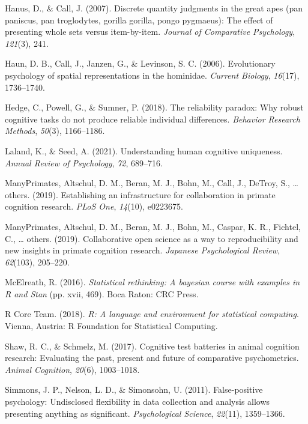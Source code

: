\documentclass[10pt, letterpaper]{article}
\begin{document}
\leavevmode\hypertarget{ref-hanus2007discrete}{}%
Hanus, D., \& Call, J. (2007). Discrete quantity judgments in the great
apes (pan paniscus, pan troglodytes, gorilla gorilla, pongo pygmaeus):
The effect of presenting whole sets versus item-by-item. \emph{Journal
of Comparative Psychology}, \emph{121}(3), 241.

\leavevmode\hypertarget{ref-haun2006evolutionary}{}%
Haun, D. B., Call, J., Janzen, G., \& Levinson, S. C. (2006).
Evolutionary psychology of spatial representations in the hominidae.
\emph{Current Biology}, \emph{16}(17), 1736--1740.

\leavevmode\hypertarget{ref-hedge2018reliability}{}%
Hedge, C., Powell, G., \& Sumner, P. (2018). The reliability paradox:
Why robust cognitive tasks do not produce reliable individual
differences. \emph{Behavior Research Methods}, \emph{50}(3), 1166--1186.

\leavevmode\hypertarget{ref-laland2021understanding}{}%
Laland, K., \& Seed, A. (2021). Understanding human cognitive
uniqueness. \emph{Annual Review of Psychology}, \emph{72}, 689--716.

\leavevmode\hypertarget{ref-many2019establishing}{}%
ManyPrimates, Altschul, D. M., Beran, M. J., Bohn, M., Call, J., DeTroy,
S., \ldots{} others. (2019). Establishing an infrastructure for
collaboration in primate cognition research. \emph{PLoS One},
\emph{14}(10), e0223675.

\leavevmode\hypertarget{ref-primates2019collaborative}{}%
ManyPrimates, Altschul, D. M., Beran, M. J., Bohn, M., Caspar, K. R.,
Fichtel, C., \ldots{} others. (2019). Collaborative open science as a
way to reproducibility and new insights in primate cognition research.
\emph{Japanese Psychological Review}, \emph{62}(103), 205--220.

\leavevmode\hypertarget{ref-rethinking}{}%
McElreath, R. (2016). \emph{Statistical rethinking: A bayesian course
with examples in R and Stan} (pp. xvii, 469). Boca Raton: CRC Press.

\leavevmode\hypertarget{ref-R-base}{}%
R Core Team. (2018). \emph{R: A language and environment for statistical
computing}. Vienna, Austria: R Foundation for Statistical Computing.

\leavevmode\hypertarget{ref-shaw2017cognitive}{}%
Shaw, R. C., \& Schmelz, M. (2017). Cognitive test batteries in animal
cognition research: Evaluating the past, present and future of
comparative psychometrics. \emph{Animal Cognition}, \emph{20}(6),
1003--1018.

\leavevmode\hypertarget{ref-simmons2011false}{}%
Simmons, J. P., Nelson, L. D., \& Simonsohn, U. (2011). False-positive
psychology: Undisclosed flexibility in data collection and analysis
allows presenting anything as significant. \emph{Psychological Science},
\emph{22}(11), 1359--1366.
\end{document}
